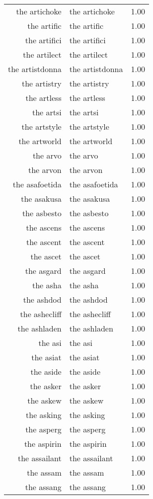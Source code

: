 \begin{table}[ht]
\begin{tabular}{rlr}
  the artichoke & the artichoke & 1.00 \\ 
  the artific & the artific & 1.00 \\ 
  the artifici & the artifici & 1.00 \\ 
  the artilect & the artilect & 1.00 \\ 
  the artistdonna & the artistdonna & 1.00 \\ 
  the artistry & the artistry & 1.00 \\ 
  the artless & the artless & 1.00 \\ 
  the artsi & the artsi & 1.00 \\ 
  the artstyle & the artstyle & 1.00 \\ 
  the artworld & the artworld & 1.00 \\ 
  the arvo & the arvo & 1.00 \\ 
  the arvon & the arvon & 1.00 \\ 
  the asafoetida & the asafoetida & 1.00 \\ 
  the asakusa & the asakusa & 1.00 \\ 
  the asbesto & the asbesto & 1.00 \\ 
  the ascens & the ascens & 1.00 \\ 
  the ascent & the ascent & 1.00 \\ 
  the ascet & the ascet & 1.00 \\ 
  the asgard & the asgard & 1.00 \\ 
  the asha & the asha & 1.00 \\ 
  the ashdod & the ashdod & 1.00 \\ 
  the ashecliff & the ashecliff & 1.00 \\ 
  the ashladen & the ashladen & 1.00 \\ 
  the asi & the asi & 1.00 \\ 
  the asiat & the asiat & 1.00 \\ 
  the aside & the aside & 1.00 \\ 
  the asker & the asker & 1.00 \\ 
  the askew & the askew & 1.00 \\ 
  the asking & the asking & 1.00 \\ 
  the asperg & the asperg & 1.00 \\ 
  the aspirin & the aspirin & 1.00 \\ 
  the assailant & the assailant & 1.00 \\ 
  the assam & the assam & 1.00 \\ 
  the assang & the assang & 1.00 \\ 

\end{tabular}
\end{table}
